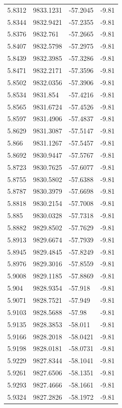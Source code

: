 \begin{table}[H]
\begin{tabular}{llll}
5.8312 & 9833.1231 & -57.2045 & -9.81 \\
5.8344 & 9832.9421 & -57.2355 & -9.81 \\
5.8376 & 9832.761 & -57.2665 & -9.81 \\
5.8407 & 9832.5798 & -57.2975 & -9.81 \\
5.8439 & 9832.3985 & -57.3286 & -9.81 \\
5.8471 & 9832.2171 & -57.3596 & -9.81 \\
5.8502 & 9832.0356 & -57.3906 & -9.81 \\
5.8534 & 9831.854 & -57.4216 & -9.81 \\
5.8565 & 9831.6724 & -57.4526 & -9.81 \\
5.8597 & 9831.4906 & -57.4837 & -9.81 \\
5.8629 & 9831.3087 & -57.5147 & -9.81 \\
5.866 & 9831.1267 & -57.5457 & -9.81 \\
5.8692 & 9830.9447 & -57.5767 & -9.81 \\
5.8723 & 9830.7625 & -57.6077 & -9.81 \\
5.8755 & 9830.5802 & -57.6388 & -9.81 \\
5.8787 & 9830.3979 & -57.6698 & -9.81 \\
5.8818 & 9830.2154 & -57.7008 & -9.81 \\
5.885 & 9830.0328 & -57.7318 & -9.81 \\
5.8882 & 9829.8502 & -57.7629 & -9.81 \\
5.8913 & 9829.6674 & -57.7939 & -9.81 \\
5.8945 & 9829.4845 & -57.8249 & -9.81 \\
5.8976 & 9829.3016 & -57.8559 & -9.81 \\
5.9008 & 9829.1185 & -57.8869 & -9.81 \\
5.904 & 9828.9354 & -57.918 & -9.81 \\
5.9071 & 9828.7521 & -57.949 & -9.81 \\
5.9103 & 9828.5688 & -57.98 & -9.81 \\
5.9135 & 9828.3853 & -58.011 & -9.81 \\
5.9166 & 9828.2018 & -58.0421 & -9.81 \\
5.9198 & 9828.0181 & -58.0731 & -9.81 \\
5.9229 & 9827.8344 & -58.1041 & -9.81 \\
5.9261 & 9827.6506 & -58.1351 & -9.81 \\
5.9293 & 9827.4666 & -58.1661 & -9.81 \\
5.9324 & 9827.2826 & -58.1972 & -9.81 \\

\end{tabular}
\end{table}
